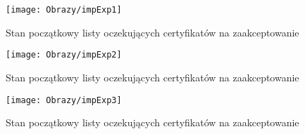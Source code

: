\begin{enumerate*}
	
	
	\begin{figure}[ht!]
		\begin{minipage}{0.2\textwidth}
			\texttt{[image: Obrazy/impExp1]}
			\caption{Stan początkowy listy oczekujących certyfikatów na zaakceptowanie }
			\label{rys:impExp1}
		\end{minipage}
		\begin{minipage}{0.2\textwidth}
			\texttt{[image: Obrazy/impExp2]}
			\caption{Stan początkowy listy oczekujących certyfikatów na zaakceptowanie }
			\label{rys:impExp2}
		\end{minipage}
		
		\begin{minipage}{0.2\textwidth}
			\texttt{[image: Obrazy/impExp3]}
			\caption{Stan początkowy listy oczekujących certyfikatów na zaakceptowanie }
			\label{rys:impExp3}
		\end{minipage}
		
		
		
		
	\end{figure}
	
\end{enumerate*}
